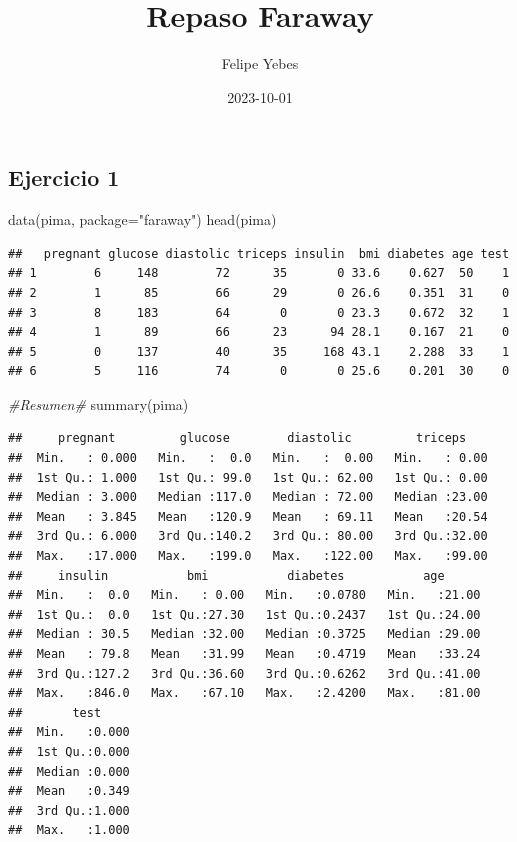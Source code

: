 \documentclass[
]{article}
\title{Repaso Faraway}
\author{Felipe Yebes}
\date{2023-10-01}
\newenvironment{Shaded}{\begin{snugshade}}{\end{snugshade}}
\newcommand{\AttributeTok}[1]{\textcolor[rgb]{0.77,0.63,0.00}{#1}}
\newcommand{\CommentTok}[1]{\textcolor[rgb]{0.56,0.35,0.01}{\textit{#1}}}
\newcommand{\FunctionTok}[1]{\textcolor[rgb]{0.00,0.00,0.00}{#1}}
\newcommand{\NormalTok}[1]{#1}
\newcommand{\StringTok}[1]{\textcolor[rgb]{0.31,0.60,0.02}{#1}}
\begin{document}
\maketitle

{
\setcounter{tocdepth}{2}
\tableofcontents
}
\hypertarget{ejercicio-1}{%
\subsection{Ejercicio 1}\label{ejercicio-1}}

\begin{Shaded}
\begin{Highlighting}[]
\FunctionTok{data}\NormalTok{(pima, }\AttributeTok{package=}\StringTok{"faraway"}\NormalTok{)}
\FunctionTok{head}\NormalTok{(pima)}
\end{Highlighting}
\end{Shaded}

\begin{verbatim}
##   pregnant glucose diastolic triceps insulin  bmi diabetes age test
## 1        6     148        72      35       0 33.6    0.627  50    1
## 2        1      85        66      29       0 26.6    0.351  31    0
## 3        8     183        64       0       0 23.3    0.672  32    1
## 4        1      89        66      23      94 28.1    0.167  21    0
## 5        0     137        40      35     168 43.1    2.288  33    1
## 6        5     116        74       0       0 25.6    0.201  30    0
\end{verbatim}

\begin{Shaded}
\begin{Highlighting}[]
\CommentTok{\#Resumen\#}
\FunctionTok{summary}\NormalTok{(pima)}
\end{Highlighting}
\end{Shaded}

\begin{verbatim}
##     pregnant         glucose        diastolic         triceps     
##  Min.   : 0.000   Min.   :  0.0   Min.   :  0.00   Min.   : 0.00  
##  1st Qu.: 1.000   1st Qu.: 99.0   1st Qu.: 62.00   1st Qu.: 0.00  
##  Median : 3.000   Median :117.0   Median : 72.00   Median :23.00  
##  Mean   : 3.845   Mean   :120.9   Mean   : 69.11   Mean   :20.54  
##  3rd Qu.: 6.000   3rd Qu.:140.2   3rd Qu.: 80.00   3rd Qu.:32.00  
##  Max.   :17.000   Max.   :199.0   Max.   :122.00   Max.   :99.00  
##     insulin           bmi           diabetes           age       
##  Min.   :  0.0   Min.   : 0.00   Min.   :0.0780   Min.   :21.00  
##  1st Qu.:  0.0   1st Qu.:27.30   1st Qu.:0.2437   1st Qu.:24.00  
##  Median : 30.5   Median :32.00   Median :0.3725   Median :29.00  
##  Mean   : 79.8   Mean   :31.99   Mean   :0.4719   Mean   :33.24  
##  3rd Qu.:127.2   3rd Qu.:36.60   3rd Qu.:0.6262   3rd Qu.:41.00  
##  Max.   :846.0   Max.   :67.10   Max.   :2.4200   Max.   :81.00  
##       test      
##  Min.   :0.000  
##  1st Qu.:0.000  
##  Median :0.000  
##  Mean   :0.349  
##  3rd Qu.:1.000  
##  Max.   :1.000
\end{verbatim}
\end{document}
